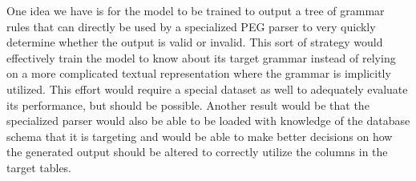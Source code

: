 \documentclass[11pt]{article}
\begin{document}
One idea we have is for the model to be trained to output a tree of grammar rules that can directly be used by a specialized PEG parser to very quickly determine whether the output is valid or invalid. This sort of strategy would effectively train the model to know about its target grammar instead of relying on a more complicated textual representation where the grammar is implicitly utilized. This effort would require a special dataset as well to adequately evaluate its performance, but should be possible. Another result would be that the specialized parser would also be able to be loaded with knowledge of the database schema that it is targeting and would be able to make better decisions on how the generated output should be altered to correctly utilize the columns in the target tables.







\end{document}
